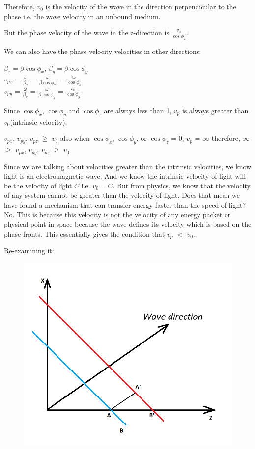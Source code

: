 Therefore, $v_0$ is the velocity of the wave in the direction perpendicular to the phase i.e. the wave velocity in an unbound medium.

But the phase velocity of the wave in the z-direction is $\frac{v_0}{\cos\phi_{z}}$.

We can also have the phase velocity velocities in other directions:
\begin{center}
$\beta_x = \beta\cos\phi_{x}$, $\beta_y = \beta\cos\phi_{y}$\\
$v_{px}$ = $\frac{\omega}{\beta_x}$ = $\frac{\omega}{\beta\cos\phi_{x}}$ = $\frac{v_0}{\cos\phi_{x}}$\\
$v_{py}$ = $\frac{\omega}{\beta_y}$ = $\frac{\omega}{\beta\cos\phi_{y}}$ = $\frac{v_0}{\cos\phi_{y}}$
\end{center}
Since $\cos\phi_{x}$, $\cos\phi_{y}$ and $\cos\phi_{z}$ are always less than 1, $v_p$ is always greater than $v_0$(intrinsic velocity).
\begin{center}
$v_{px}$, $v_{py}$, $v_{pz}$ $\geq$ $v_0$
also when $\cos\phi_{x}$, $\cos\phi_{y}$, or $\cos\phi_{z}$ = 0, $v_p$ = $\infty$
therefore, $\infty$ $\geq$ $v_{px}$, $v_{py}$, $v_{pz}$ $\geq$ $v_0$
\end{center}
Since we are talking about velocities greater than the intrinsic velocities, we know light is an electromagnetic wave. And we know the intrinsic velocity of light will be the velocity of light $C$ i.e. $v_0 = C$.
But from physics, we know that the velocity of any system cannot be greater than the velocity of light.
Does that mean we have found a mechanism that can transfer energy faster than the speed of light?
No. This is because this velocity is not the velocity of any energy packet or physical point in space because the wave defines its velocity which is based on the phase fronts. This essentially gives the condition that $v_p$ $<$ $v_0$.

Re-examining it:
\begin{figure}[h]
\centering
\includegraphics[width=.7\linewidth]{graphics/phase_velocity_of_wave}
\caption{}
\label{fig:wave_with_constant_wave_fonts_in_xy_plane}
\end{figure}

